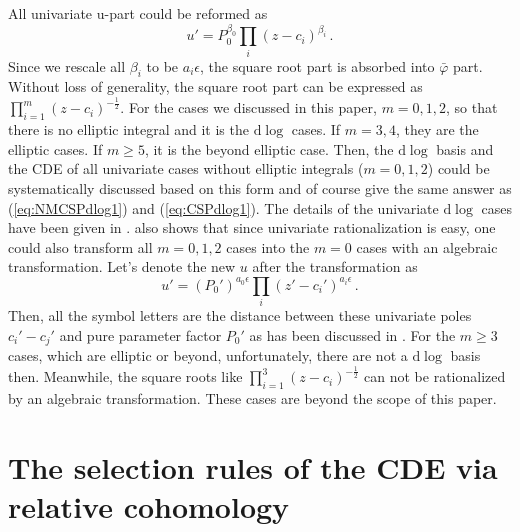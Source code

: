 \documentclass[a4paper,11pt]{article}
\newcommand{\nd}{\mathrm{d}}
\newcommand{\ep}{\epsilon}
\def\eref#1{(\ref{#1})}
\begin{document}
All univariate u-part could be reformed as 
\begin{equation}
u' =P_0^{\beta_0} \prod_i (z-c_i)^{\beta_i} \,.
\end{equation}
Since we rescale all $\beta_i$ to be $a_i \ep$, the square root part is absorbed into $\bar{\varphi}$ part. Without loss of generality, the square root part can be expressed as $\prod_{i=1}^{m}(z-c_i)^{-\frac{1}{2}}$. For the cases we discussed in this paper, $m=0,1,2$, so that there is no elliptic integral and it is the $\nd \log$ cases. If $m=3,4$, they are the elliptic cases. If $m\geq 5$, it is the beyond elliptic case.
Then, the $\nd \log$ basis and the CDE of all univariate cases without elliptic integrals ($m=0,1,2$) could be systematically discussed based on this form and of course give the same answer as \eref{eq:NMCSPdlog1} and \eref{eq:CSPdlog1}. The details of the univariate $\nd \log$ cases have been given in \cite{Chen:2023kgw}. \cite{Chen:2023kgw} also shows that since univariate rationalization is easy, one could also transform all $m=0,1,2$ cases into the $m=0$ cases with an algebraic transformation. Let's denote the new $u$ after the transformation as 
\begin{equation}
u'=(P_0')^{a_0 \ep} \prod_i (z'-c_i')^{a_i \ep} \,.
\end{equation}
Then, all the symbol letters are the distance between these univariate poles $c_i'-c_j'$ and pure parameter factor $P_0'$ as has been discussed in \cite{Chen:2023kgw}. For the $m\geq 3$ cases, which are elliptic or beyond, unfortunately, there are not a $\nd \log$ basis then. Meanwhile, the square roots like $\prod_{i=1}^{3}(z-c_i)^{-\frac{1}{2}}$ can not be rationalized by an algebraic transformation. These cases are beyond the scope of this paper.


\section{The selection rules of the CDE via relative cohomology} \label{sec:RC}
\end{document}
